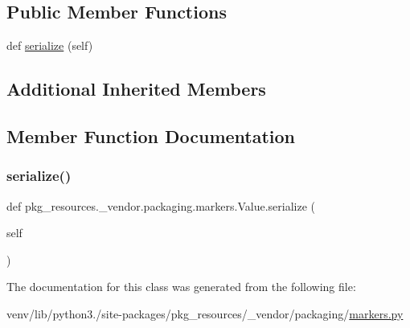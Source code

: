 \subsection*{Public Member Functions}
\begin{DoxyCompactItemize}
\item 
def \hyperlink{classpkg__resources_1_1__vendor_1_1packaging_1_1markers_1_1Value_a1954ee7747ad3d3b6ea03a9c61fedd03}{serialize} (self)
\end{DoxyCompactItemize}
\subsection*{Additional Inherited Members}


\subsection{Member Function Documentation}
\mbox{\label{classpkg__resources_1_1__vendor_1_1packaging_1_1markers_1_1Value_a1954ee7747ad3d3b6ea03a9c61fedd03}} 
\subsubsection{\texorpdfstring{serialize()}{serialize()}}
{\footnotesize\ttfamily def pkg\+\_\+resources.\+\_\+vendor.\+packaging.\+markers.\+Value.\+serialize (\begin{DoxyParamCaption}\item[{}]{self }\end{DoxyParamCaption})}



The documentation for this class was generated from the following file\+:\begin{DoxyCompactItemize}
\item 
venv/lib/python3./site-\/packages/pkg\+\_\+resources/\+\_\+vendor/packaging/\hyperlink{pkg__resources_2__vendor_2packaging_2markers_8py}{markers.\+py}\end{DoxyCompactItemize}
